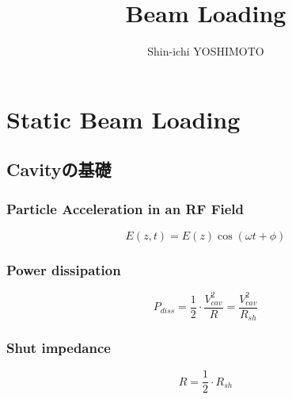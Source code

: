 \documentclass[book]{jlreq}
\begin{document}
\title{Beam Loading}
\author{Shin-ichi YOSHIMOTO}
\maketitle
\tableofcontents


\chapter{Static Beam Loading}
\section{Cavityの基礎}
\subsection{Particle Acceleration in an RF Field}
\begin{equation}
    E(z, t) = E(z)\cos(\omega t+\phi)
\end{equation}


\subsection{Power dissipation}
\begin{equation}
    P_{diss} = \frac{1}{2} \cdot \frac{V_{cav}^2}{R} = \frac{V_{cav}^2}{R_{sh}}
\end{equation}

\subsection{Shut impedance}
\begin{equation}
    R = \frac{1}{2}\cdot R_{sh}
\end{equation}
\end{document}
